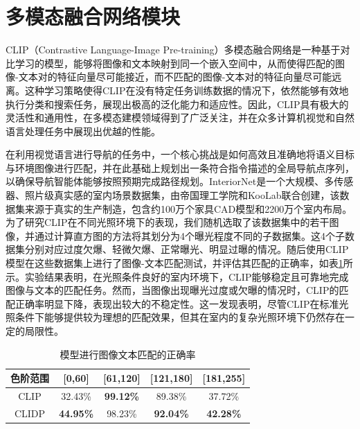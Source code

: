 \section{多模态融合网络模块}
CLIP（Contrastive Language-Image Pre-training）多模态融合网络\cite{radford2021learning}是一种基于对比学习的模型，能够将图像和文本映射到同一个嵌入空间中，从而使得匹配的图像-文本对的特征向量尽可能接近，而不匹配的图像-文本对的特征向量尽可能远离。这种学习策略使得CLIP在没有特定任务训练数据的情况下，依然能够有效地执行分类和搜索任务，展现出极高的泛化能力和适应性。因此，CLIP具有极大的灵活性和通用性，在多模态建模领域得到了广泛关注，并在众多计算机视觉和自然语言处理任务中展现出优越的性能。

在利用视觉语言进行导航的任务中，一个核心挑战是如何高效且准确地将语义目标与环境图像进行匹配，并在此基础上规划出一条符合指令描述的全局导航点序列，以确保导航智能体能够按照预期完成路径规划。InteriorNet\cite{li2018interiornet}是一个大规模、多传感器、照片级真实感的室内场景数据集，由帝国理工学院和KooLab联合创建，该数据集来源于真实的生产制造，包含约100万个家具CAD模型和2200万个室内布局。为了研究CLIP在不同光照环境下的表现，我们随机选取了该数据集中的若干图像，并通过计算直方图的方法将其划分为4个曝光程度不同的子数据集。这4个子数据集分别对应过度欠爆、轻微欠爆、正常曝光、明显过曝的情况。随后使用CLIP模型在这些数据集上进行了图像-文本匹配测试，并评估其匹配的正确率，如表\ref{Matching_accuracy}所示。实验结果表明，在光照条件良好的室内环境下，CLIP能够稳定且可靠地完成图像与文本的匹配任务。然而，当图像出现曝光过度或欠曝的情况时，CLIP的匹配正确率明显下降，表现出较大的不稳定性。这一发现表明，尽管CLIP在标准光照条件下能够提供较为理想的匹配效果，但其在室内的复杂光照环境下仍然存在一定的局限性。

\begin{table}[ht]
	\centering
	\caption{模型进行图像文本匹配的正确率} %
	\begin{tabular}{ccccc} %
	\toprule %
	色阶范围 & [0,60] & [61,120] & [121,180] & [181,255]  \\ %
	\midrule %
	CLIP & 32.43\% & \textbf{99.12\%} & 89.38\% & 37.72\% \\ %
	CLIDP & \textbf{44.95\%} & 98.23\% & \textbf{92.04\%} & \textbf{42.28\%} \\ %
	\bottomrule %
	\end{tabular}
	\label{Matching_accuracy}
\end{table}

